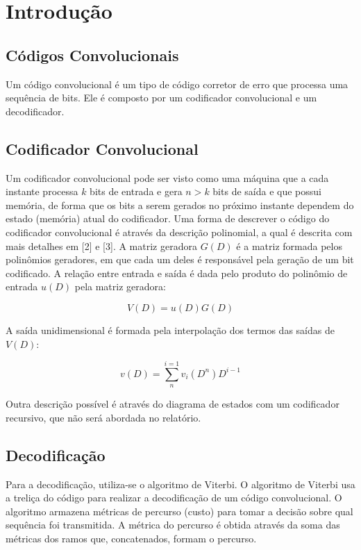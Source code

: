 \section{Introdução}

\subsection{Códigos Convolucionais}

Um código convolucional é um tipo de código corretor de erro que processa uma sequência de bits. Ele é composto por um codificador convolucional e um decodificador.


\subsection{Codificador Convolucional}

Um codificador convolucional pode ser visto como uma máquina que a cada instante processa $k$ bits de entrada e gera $n > k$ bits de saída e que possui memória, de forma que os bits a serem gerados no próximo instante dependem do estado (memória) atual do codificador.
Uma forma de descrever o código do codificador convolucional é através da descrição polinomial, a qual é descrita com mais detalhes em [2] e [3]. A matriz geradora $G(D)$ é a matriz formada pelos polinômios geradores, em que cada um deles é responsável pela geração de um bit codificado. A relação entre entrada e saída é dada pelo produto do polinômio de entrada $u(D)$ pela matriz geradora:

\begin{equation}
V(D)=u(D)G(D)
\end{equation}

A saída unidimensional é formada pela interpolação dos termos das saídas de $V(D)$:

\begin{equation}
v(D)= \sum_{n}^{i=1} v_{i}(D^{n})D^{i-1}
\end{equation}

Outra descrição possível é através do diagrama de estados com um codificador recursivo, que não será abordada no relatório. 

\subsection{Decodificação}
Para a decodificação, utiliza-se o algoritmo de Viterbi. O algoritmo de Viterbi usa a treliça do código para realizar a decodificação de um código convolucional. O algoritmo armazena métricas de percurso (custo) para tomar a decisão sobre qual sequência foi transmitida. A métrica do percurso é obtida através da soma das métricas dos ramos que, concatenados, formam o percurso.


